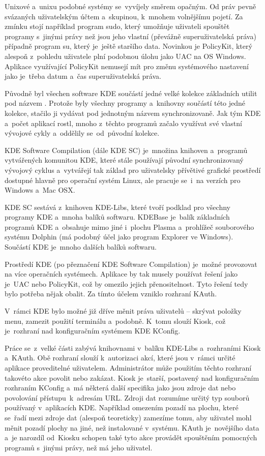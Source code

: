 Unixové a~unixu podobné systémy se~vyvíjely směrem opačným. Od práv pevně svázaných uživatelským účtem a~skupinou, k~mnohem volnějšímu pojetí. Za zmínku stojí například program sudo, který umožňuje uživateli spouštět programy s~jinými právy než jsou jeho vlastní (převážně superuživatelská práva) případně program su, který je~ještě staršího data. Novinkou je PolicyKit, který alespoň z~pohledu uživatele plní podobnou úlohu jako UAC na OS Windows. Aplikace využívající PolicyKit nemusejí mít pro změnu systémového nastavení jako je~třeba datum a~čas superuživatelská práva.


Původně byl všechen software KDE součástí jedné velké kolekce základních utilit pod názvem . Protože byly všechny programy a~knihovny součástí této jedné kolekce, stačilo ji vydávat pod jednotným názvem synchronizovaně. Jak tým KDE a~počet aplikací rostl, mnoho z~těchto programů začalo využívat své vlastní vývojové cykly a~oddělily se~od~původní kolekce.

KDE Software Compilation (dále KDE SC) je~množina knihoven a~programů vytvářených komunitou KDE, které stále používají původní synchronizovaný vývojový cyklus a~vytvářejí tak základ pro uživatelsky přívětivé grafické prostředí dostupné hlavně pro operační systém Linux, ale pracuje se~i~na verzích pro Windows a~Mac OSX.

KDE SC sestává z~knihoven KDE-Libs, které tvoří podklad pro všechny programy KDE a~mnoha balíků softwaru. KDEBase je~balík základních programů KDE a~obsahuje mimo jiné i~plochu Plasma a~prohlížeč souborového systému Dolphin (má podobný účel jako program Explorer ve Windows). Součástí KDE je~mnoho dalších balíků softwaru.

Prostředí KDE (po přeznačení KDE Software Compilation) je~možné provozovat na více operačních systémech. Aplikace by tak musely používat řešení jako je~UAC nebo PolicyKit, což by omezilo jejich přenositelnost. Tyto řešení tedy bylo potřeba nějak obalit. Za tímto účelem vzniklo rozhraní KAuth.\cite{whatiskde}


V~rámci KDE bylo možné již dříve měnit práva uživatelů -- skrývat položky menu, zamezit použití terminálu a~podobně. K~tomu slouží Kiosk, což je~rozhraní nad konfiguračním systémem KDE KConfig.

Práce se~z~velké části zabývá knihovnami v~balíku KDE-Libs a~rozhraními Kiosk a~KAuth. Obě rozhraní slouží k~autorizaci akcí, které jsou v~rámci určité aplikace proveditelné uživatelem. Administrátor může použitím těchto rozhraní takovéto akce povolit nebo zakázat. Kiosk je~starší, postavený nad konfiguračním rozhraním KConfig a~má některá další specifika jako jsou zdroje dat nebo povolování přístupu~k~adresám URL. Zdroji dat rozumíme určitý typ souborů používaný v~aplikacích KDE. Například omezením pozadí na plochu, které se~řadí mezi zdroje dat (alespoň teoreticky) zamezíme tomu, aby uživatel mohl měnit pozadí plochy na jiné, než instalované v~systému. KAuth je~novějšího data a~je narozdíl od~Kiosku schopen také tyto akce provádět spouštěním pomocných programů s~jinými právy, než má jeho uživatel.

